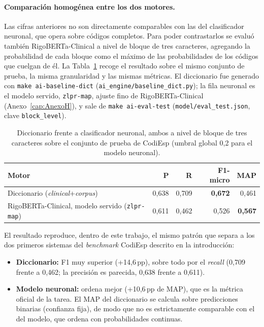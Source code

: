 \paragraph{Comparación homogénea entre los dos motores.}
Las cifras anteriores no son directamente comparables con las del clasificador neuronal, que opera sobre códigos completos. Para poder contrastarlos se evaluó también RigoBERTa-Clinical a nivel de bloque de tres caracteres, agregando la probabilidad de cada bloque como el máximo de las probabilidades de los códigos que cuelgan de él. La Tabla~\ref{tab:motores} recoge el resultado sobre el mismo conjunto de prueba, la misma granularidad y las mismas métricas. El diccionario fue generado con \texttt{make ai-baseline-dict} (\texttt{ai\_engine/\allowbreak{}baseline\_dict.py}); la fila neuronal es el modelo servido, \texttt{zlpr-map}, ajuste fino de RigoBERTa-Clinical (Anexo~\ref{cap:AnexoH}), y sale de \texttt{make ai-eval-test} (\texttt{model/\allowbreak{}eval\_test.json}, clave \texttt{block\_level}).

\begin{table}[h]
\centering
\small
\caption{Diccionario frente a clasificador neuronal, ambos a nivel de bloque de tres caracteres sobre el conjunto de prueba de CodiEsp (umbral global 0,2 para el modelo neuronal). }
\label{tab:motores}
\begin{tabular}{lrrrr}
\hline
\textbf{Motor} & \textbf{P} & \textbf{R} & \textbf{F1-micro} & \textbf{MAP} \\
\hline
Diccionario (\emph{clinical}+\emph{corpus}) & 0{,}638 & 0{,}709 & \textbf{0{,}672} & 0{,}461 \\
RigoBERTa-Clinical, modelo servido (\texttt{zlpr-map}) & 0{,}611 & 0{,}462 & 0{,}526 & \textbf{0{,}567} \\
\hline
\end{tabular}
\end{table}

El resultado reproduce, dentro de este trabajo, el mismo patrón que separa a los dos primeros sistemas del \emph{benchmark} CodiEsp descrito en la introducción:

\begin{itemize}
 \item \textbf{Diccionario:} F1 muy superior (+14{,}6\,pp), sobre todo por el \emph{recall} (0{,}709 frente a 0{,}462; la precisión es parecida, 0{,}638 frente a 0{,}611).
 \item \textbf{Modelo neuronal:} ordena mejor (+10{,}6\,pp de MAP), que es la métrica oficial de la tarea. El MAP del diccionario se calcula sobre predicciones binarias (confianza fija), de modo que no es estrictamente comparable con el del modelo, que ordena con probabilidades continuas.
\end{itemize}

